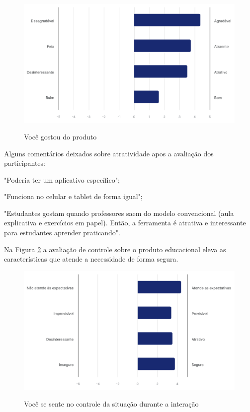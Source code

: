 \begin{figure}[h!]
    \caption{Você gostou do produto}
    \centering
    \includegraphics[scale=0.4]{figuras/resultados/ux-1.png}
    \label{fig:ux-1}
\end{figure}

Alguns comentários deixados sobre atratividade apos a avaliação dos participantes:

\begin{citacao}
\item "Poderia ter um aplicativo específico";
\item "Funciona no celular e tablet de forma igual";
\item "Estudantes gostam quando professores saem do modelo convencional (aula explicativa e exercícios em papel). Então, a ferramenta é atrativa e interessante para estudantes aprender praticando".
\end{citacao}

Na Figura \ref{fig:ux-3} a avaliação de controle sobre o produto educacional eleva as características que atende a necessidade de forma segura.

\begin{figure}[h!]
    \caption{Você se sente no controle da situação durante a interação}
    \centering
    \includegraphics[scale=0.4]{figuras/resultados/ux-3.png}
    \label{fig:ux-3}
\end{figure}

